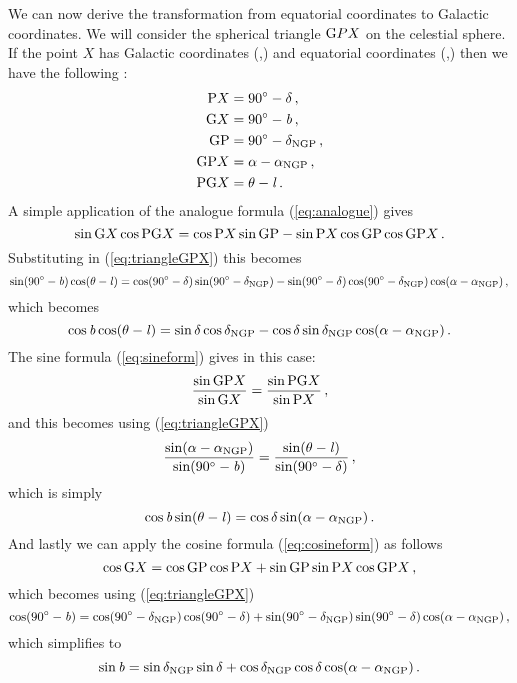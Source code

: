 We can now derive the transformation from equatorial coordinates to
Galactic coordinates. We will consider the spherical triangle $\textnormal{G} P
X$ on the celestial sphere. If the point $X$ has Galactic coordinates
(\gall,\galb) and equatorial coordinates (\ra,\dec) then we have the
following \citep{Green85a}:
\begin{align}\label{eq:triangleGPX}
\textnormal{P} X &= 90^{\circ}-\delta\, ,\\
\textnormal{G} X &= 90^{\circ} - {\it b}\, ,\\
\textnormal{G}\textnormal{P} &= 90^{\circ}-\delta_{\textnormal{NGP}}\, ,\\
\textnormal{G} \textnormal{P} X &= \alpha-\alpha_{\textnormal{NGP}}\, ,\\
\textnormal{P} \textnormal{G} X &= \theta-{\it l}\, .
\end{align}
A simple application of the analogue formula (\ref{eq:analogue}) gives
\begin{equation}
\sin \textnormal{G} X \cos \textnormal{P} \textnormal{G} X = \cos \textnormal{P} X \sin \textnormal{G} \textnormal{P} - \sin \textnormal{P} X \cos \textnormal{G} \textnormal{P}  \cos \textnormal{G} \textnormal{P} X\, .\\
\end{equation}
Substituting in (\ref{eq:triangleGPX}) this becomes
\begin{equation}
\sin(90^{\circ} - {\it b}) \cos(\theta-{\it l}) = \cos(90^{\circ}-\delta) \sin(90^{\circ}-\delta_{\textnormal{NGP}}) - \sin(90^{\circ}-\delta) \cos(90^{\circ}-\delta_{\textnormal{NGP}}) \cos(\alpha-\alpha_{\textnormal{NGP}})\, ,\\
\end{equation}
which becomes
\begin{equation}\label{eq:radectolb1}
\cos{\it b} \cos(\theta-{\it l}) = \sin\delta \cos\delta_{\textnormal{NGP}} - \cos\delta \sin\delta_{\textnormal{NGP}} \cos(\alpha-\alpha_{\textnormal{NGP}})\, .
\end{equation}
The sine formula (\ref{eq:sineform}) gives in this case:
\begin{equation}
\frac{\sin \textnormal{G} \textnormal{P} X}{\sin \textnormal{G} X} = \frac{\sin \textnormal{P} \textnormal{G} X}{\sin \textnormal{P} X}\, ,
\end{equation}
and this becomes using (\ref{eq:triangleGPX})
\begin{equation}
\frac{\sin(\alpha-\alpha_{\textnormal{NGP}})}{\sin(90^{\circ} - {\it b})} = \frac{\sin(\theta-{\it l})}{\sin(90^{\circ}-\delta)}\, ,
\end{equation}
which is simply
\begin{equation}\label{eq:radectolb2}
\cos {\it b} \sin(\theta-{\it l})=\cos \delta \sin (\alpha-\alpha_{\textnormal{NGP}})\, .
\end{equation}
And lastly we can apply the cosine formula (\ref{eq:cosineform}) as follows
\begin{equation}
\cos \textnormal{G} X = \cos \textnormal{G} \textnormal{P}  \cos \textnormal{P} X + \sin \textnormal{G} \textnormal{P} \sin \textnormal{P} X \cos \textnormal{G} \textnormal{P} X\, ,
\end{equation}
which becomes using (\ref{eq:triangleGPX})
\begin{equation}
\cos (90^{\circ} - {\it b}) = \cos(90^{\circ}-\delta_{\textnormal{NGP}}) \cos(90^{\circ}-\delta) + \sin(90^{\circ}-\delta_{\textnormal{NGP}}) \sin(90^{\circ}-\delta) \cos(\alpha-\alpha_{\textnormal{NGP}})\, ,
\end{equation}
which simplifies to
\begin{equation}\label{eq:radectolb3}
\sin {\it b} = \sin \delta_{\textnormal{NGP}} \sin \delta + \cos\delta_{\textnormal{NGP}} \cos\delta \cos(\alpha-\alpha_{\textnormal{NGP}})\, .
\end{equation}


